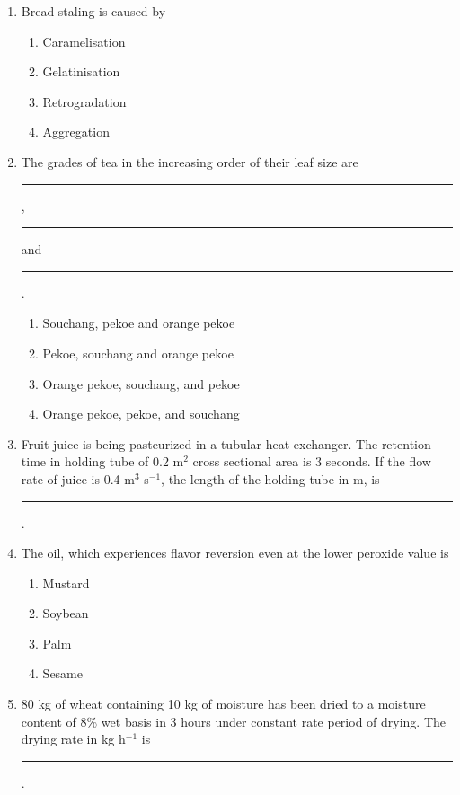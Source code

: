 \documentclass[journal,12pt,onecolumn]{IEEEtran}
\begin{document}
\begin{enumerate}[label=\arabic*.]

\item Bread staling is caused by

\begin{multicols}{4}
\begin{enumerate}[label=(\Alph*)]
\item Caramelisation
\item Gelatinisation
\item Retrogradation
\item Aggregation
\end{enumerate}
\end{multicols}

\item The grades of tea in the increasing order of their leaf size are \rule{1.5cm}{0.1pt}, \rule{1.5cm}{0.1pt}and\rule{1.5cm}{0.1pt} .

\begin{multicols}{2}
\begin{enumerate}[label=(\Alph*)]
\item Souchang, pekoe and orange pekoe
\item Pekoe, souchang and orange pekoe
\item Orange pekoe, souchang, and pekoe
\item Orange pekoe, pekoe, and souchang
\end{enumerate}
\end{multicols}

\item Fruit juice is being pasteurized in a tubular heat exchanger. The retention time in holding tube of 0.2 m$^2$ cross sectional area is 3 seconds. If the flow rate of juice is 0.4 m$^3$ s$^{-1}$, the length of the holding tube in m, is \rule{2.5cm}{0.1pt}.

\item The oil, which experiences flavor reversion even at the lower peroxide value is

\begin{multicols}{4}
\begin{enumerate}[label=(\Alph*)]
\item Mustard
\item Soybean
\item Palm
\item Sesame
\end{enumerate}
\end{multicols}

\item 80 kg of wheat containing 10 kg of moisture has been dried to a moisture content of 8\% wet basis in 3 hours under constant rate period of drying. The drying rate in kg h$^{-1}$ is \rule{2.5cm}{0.1pt}.


\end{enumerate}
\end{document}
